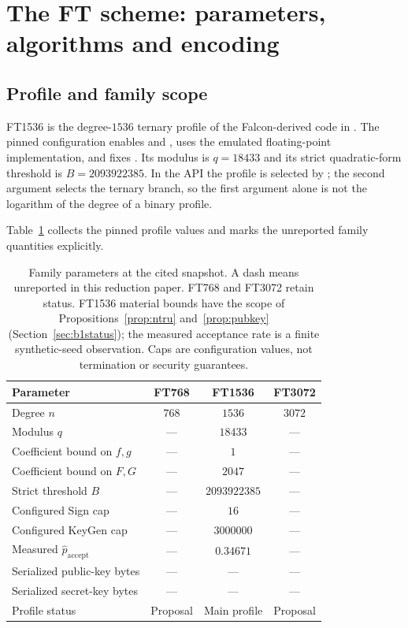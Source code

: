 \section{The FT scheme: parameters, algorithms and encoding}\label{sec:parameters}
\subsection{Profile and family scope}
FT1536 is the degree-$1536$ ternary profile of the Falcon-derived code in
. The pinned configuration enables
 and ,
uses the emulated floating-point implementation, and fixes
. Its modulus is $q=18433$ and its strict
quadratic-form threshold is $B=2093922385$. In the API the profile is
selected by ; the second argument selects
the ternary branch, so the first argument alone is not the logarithm of
the degree of a binary profile.

Table~\ref{tab:family} collects the pinned profile values and marks the
unreported family quantities explicitly.
\begin{table}[!htbp]
\centering\small
\begin{tabular}{@{}lccc@{}}
\toprule
Parameter & FT768 & FT1536 & FT3072 \\
\midrule
Degree $n$ & $768$ & $1536$ & $3072$ \\
Modulus $q$ & --- & $18433$ & --- \\
Coefficient bound on $f,g$ & --- & $1$ & --- \\
Coefficient bound on $F,G$ & --- & $2047$ & --- \\
Strict threshold $B$ & --- & $2093922385$ & --- \\
Configured Sign cap & --- & $16$ & --- \\
Configured KeyGen cap & --- & $3000000$ & --- \\
Measured $\widehat p_{\mathrm{accept}}$ & --- & $0.34671$ & --- \\
Serialized public-key bytes & --- & --- & --- \\
Serialized secret-key bytes & --- & --- & --- \\
Profile status & Proposal & Main profile & Proposal \\
\bottomrule
\end{tabular}
\caption{Family parameters at the cited snapshot. A dash means
unreported in this reduction paper. FT768 and FT3072 retain
\ALTP{} status. FT1536 material bounds have the scope of
Propositions~\ref{prop:ntru} and~\ref{prop:pubkey}
(Section~\ref{sec:b1status}); the measured acceptance rate is a finite
synthetic-seed observation. Caps are configuration values, not
termination or security guarantees.}
\label{tab:family}
\end{table}

